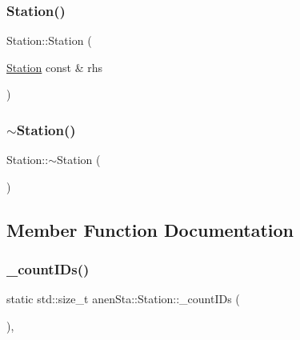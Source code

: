 \subsubsection{\texorpdfstring{Station()}{Station()}\hspace{0.1cm}{\footnotesize\ttfamily [4/4]}}
{\footnotesize\ttfamily Station\+::\+Station (\begin{DoxyParamCaption}\item[{\mbox{\hyperlink{classanen_sta_1_1_station}{Station}} const \&}]{rhs }\end{DoxyParamCaption})}

\mbox{\label{classanen_sta_1_1_station_a00434e79e8ee7f4ebd6d3b631dde5ac0}} 
\subsubsection{\texorpdfstring{$\sim$\+Station()}{~Station()}}
{\footnotesize\ttfamily Station\+::$\sim$\+Station (\begin{DoxyParamCaption}{ }\end{DoxyParamCaption})\hspace{0.3cm}{\ttfamily [virtual]}}



\subsection{Member Function Documentation}
\mbox{\label{classanen_sta_1_1_station_a6623cdce8748308c6d0e27ab4a111eb7}} 
\subsubsection{\texorpdfstring{\+\_\+count\+I\+Ds()}{\_countIDs()}}
{\footnotesize\ttfamily static std\+::size\+\_\+t anen\+Sta\+::\+Station\+::\+\_\+count\+I\+Ds (\begin{DoxyParamCaption}{ }\end{DoxyParamCaption})\hspace{0.3cm}{\ttfamily [inline]}, {\ttfamily [static]}}

